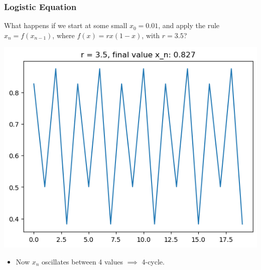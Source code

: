 \documentclass[9pt]{beamer}
\begin{document}
\begin{frame}
	\frametitle{Logistic Equation}

	What happens if we start at some small \( x_0 = 0.01 \), and 
	apply the rule \( x_n = f(x_{n - 1}) \), where 
	\( f(x) = rx(1 - x) \), with \( r = 3.5 \)? 
	
	\begin{center}
		\includegraphics[scale=0.4]{r=3.5.png}
	\end{center}
	
	\pause
	\begin{itemize}
		\item Now \( x_n \) oscillates between 4 values \( \implies  \)
			4-cycle. 
	\end{itemize}
\end{frame}
\end{document}
